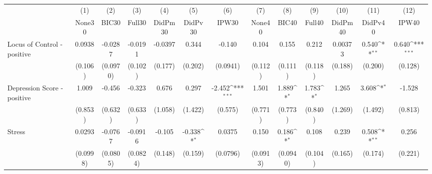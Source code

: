 {
\def\sym#1{\ifmmode^{#1}\else\(^{#1}\)\fi}
\begin{tabular}{l*{12}{c}}
\toprule
            &\multicolumn{1}{c}{(1)}&\multicolumn{1}{c}{(2)}&\multicolumn{1}{c}{(3)}&\multicolumn{1}{c}{(4)}&\multicolumn{1}{c}{(5)}&\multicolumn{1}{c}{(6)}&\multicolumn{1}{c}{(7)}&\multicolumn{1}{c}{(8)}&\multicolumn{1}{c}{(9)}&\multicolumn{1}{c}{(10)}&\multicolumn{1}{c}{(11)}&\multicolumn{1}{c}{(12)}\\
            &\multicolumn{1}{c}{None30}&\multicolumn{1}{c}{BIC30}&\multicolumn{1}{c}{Full30}&\multicolumn{1}{c}{DidPm30}&\multicolumn{1}{c}{DidPv30}&\multicolumn{1}{c}{IPW30}&\multicolumn{1}{c}{None40}&\multicolumn{1}{c}{BIC40}&\multicolumn{1}{c}{Full40}&\multicolumn{1}{c}{DidPm40}&\multicolumn{1}{c}{DidPv40}&\multicolumn{1}{c}{IPW40}\\
\midrule
Locus of Control - positive&      0.0938         &     -0.0287         &     -0.0191         &     -0.0397         &       0.344         &      -0.140         &       0.104         &       0.155         &       0.212         &     0.00373         &       0.540\sym{**} &       0.640\sym{***}\\
            &     (0.106)         &    (0.0970)         &     (0.102)         &     (0.177)         &     (0.202)         &    (0.0941)         &     (0.112)         &     (0.111)         &     (0.118)         &     (0.188)         &     (0.200)         &     (0.128)         \\
\addlinespace
Depression Score - positive&       1.009         &      -0.456         &      -0.323         &       0.676         &       0.297         &      -2.452\sym{***}&       1.501         &       1.889\sym{*}  &       1.783\sym{*}  &       1.265         &       3.608\sym{*}  &      -1.528         \\
            &     (0.853)         &     (0.632)         &     (0.633)         &     (1.058)         &     (1.422)         &     (0.575)         &     (0.771)         &     (0.773)         &     (0.840)         &     (1.269)         &     (1.492)         &     (0.813)         \\
\addlinespace
Stress      &      0.0293         &     -0.0767         &     -0.0916         &      -0.105         &      -0.338\sym{*}  &      0.0375         &       0.150         &       0.186\sym{*}  &       0.108         &       0.239         &       0.508\sym{**} &       0.256         \\
            &    (0.0998)         &    (0.0805)         &    (0.0824)         &     (0.148)         &     (0.159)         &    (0.0796)         &    (0.0913)         &    (0.0940)         &     (0.104)         &     (0.165)         &     (0.174)         &     (0.221)         \\

\end{tabular}}
